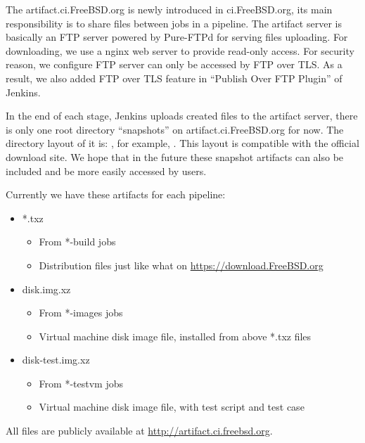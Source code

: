 \documentclass[a4paper,twocolumn,10pt]{article}
\begin{document}
The artifact.ci.FreeBSD.org is newly introduced in ci.FreeBSD.org, its main
responsibility is to share files between jobs in a pipeline.  The artifact
server is basically an FTP server powered by Pure-FTPd for serving files
uploading.  For downloading, we use a nginx web server to provide read-only
access.  For security reason, we configure FTP server can only be accessed by
FTP over TLS.  As a result, we also added FTP over TLS feature in ``Publish
Over FTP Plugin'' of Jenkins.

In the end of each stage, Jenkins uploads created files to the artifact server,
there is only one root directory ``snapshots'' on artifact.ci.FreeBSD.org for
now.  The directory layout of it is:
, for example,
 . This layout is compatible with the official
download site. We hope that in the future these snapshot artifacts can also be
included and be more easily accessed by users.

Currently we have these artifacts for each pipeline:

\begin{itemize}
\item *.txz
  \begin{itemize}
  \item From *-build jobs
  \item Distribution files just like what on \url{https://download.FreeBSD.org}
  \end{itemize}
\item disk.img.xz
  \begin{itemize}
  \item From *-images jobs
  \item Virtual machine disk image file, installed from above *.txz files
  \end{itemize}
\item disk-test.img.xz
  \begin{itemize}
  \item From *-testvm jobs
  \item Virtual machine disk image file, with test script and test case
  \end{itemize}
\end{itemize}

All files are publicly available at \url{http://artifact.ci.freebsd.org}.
\end{document}
